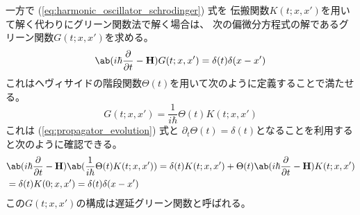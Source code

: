 一方で (\ref{eq:harmonic_oscillator_schrodinger}) 式を
伝搬関数$K(t;x,x')$を用いて解く代わりにグリーン関数法で解く場合は、
次の偏微分方程式の解であるグリーン関数$G(t;x,x')$を求める。
\begin{equation}
  \label{eq:green_function_eq}
  \ab(i\hbar\pdv{}{t}-\vb{H})G(t;x,x')=\delta(t)\delta(x-x')
\end{equation}
これはヘヴィサイドの階段関数$\Theta(t)$を用いて次のように定義することで満たせる。
\begin{equation}
  G(t;x,x')=\frac{1}{i\hbar}\Theta(t)K(t;x,x')
\end{equation}
これは (\ref{eq:propagator_evolution}) 式と
$\partial_t\Theta(t)=\delta(t)$となることを利用すると次のように確認できる。
\begin{equation}
  \begin{split}
    &\ab(i\hbar\pdv{}{t}-\vb{H})\ab(\frac{1}{i\hbar}\Theta(t)K(t;x,x'))
    =\delta(t)K(t;x,x')+\Theta(t)\ab(i\hbar\pdv{}{t}-\vb{H})K(t;x,x') \\
    &=\delta(t)K(0;x,x')=\delta(t)\delta(x-x')
  \end{split}
\end{equation}
この$G(t;x,x')$の構成は遅延グリーン関数と呼ばれる。

